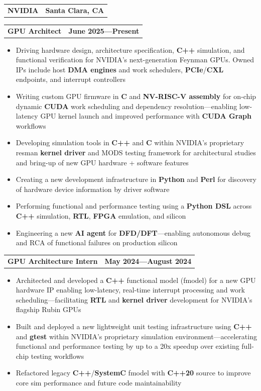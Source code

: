 \documentclass[letterpaper,10pt]{article}
\makeatletter
\newcommand{\resumeItem}[1]{
  \item \small{#1}\vspace{-2pt}
}
\newcommand{\resumeCompanyHeading}[2]{
  \vspace{-2pt}\item
    \begin{tabular*}{\textwidth}[t]{l@{\extracolsep{\fill}}r}
      {\fontsize{12}{12}\selectfont\textbf{#1}} & \small #2 \\
    \end{tabular*}\par\nobreak\vspace{-\parskip}\vspace{-4pt}
}
\newcommand{\resumeRoleHeading}[2]{
    \par\nobreak\vspace{4pt}\noindent
    \begin{tabular*}{\textwidth}[t]{l@{\extracolsep{\fill}}r}
      \hspace{0.2cm}\textbf{\normalsize #1} & \small #2 \\
    \end{tabular*}\vspace{-7pt}
}
\newcommand{\resumeExperienceItemListStart}{\begin{itemize}}
\newcommand{\resumeItemListEnd}{\end{itemize}\vspace{-5pt}}
\makeatother
\begin{document}
    \resumeCompanyHeading
      {NVIDIA}{\textbf{Santa Clara, CA}}
    \resumeRoleHeading
      {GPU Architect}{\textbf{June 2025---Present}}
    \resumeExperienceItemListStart
        \resumeItem{Driving hardware design, architecture specification, \textbf{C++} simulation, and functional verification for NVIDIA's next-generation Feynman GPUs. Owned IPs include host \textbf{DMA engines} and work schedulers, \textbf{PCIe}/\textbf{CXL} endpoints, and interrupt controllers}
        \resumeItem{Writing custom GPU firmware in \textbf{C} and \textbf{NV-RISC-V assembly} for on-chip dynamic \textbf{CUDA} work scheduling and dependency resolution---enabling low-latency GPU kernel launch and improved performance with \textbf{CUDA Graph} workflows}
        \resumeItem{Developing simulation tools in \textbf{C++} and \textbf{C} within NVIDIA's proprietary resman \textbf{kernel driver} and MODS testing framework for architectural studies and bring-up of new GPU hardware + software features}
        \resumeItem{Creating a new development infrastructure in \textbf{Python} and \textbf{Perl} for discovery of hardware device information by driver software}
        \resumeItem{Performing functional and performance testing using a \textbf{Python DSL} across \textbf{C++} simulation, \textbf{RTL}, \textbf{FPGA} emulation, and silicon}
        \resumeItem{Engineering a new \textbf{AI agent} for \textbf{DFD/DFT}---enabling autonomous debug and RCA of functional failures on production silicon}
    \resumeItemListEnd
    \vspace{-1pt}
    \resumeRoleHeading
      {GPU Architecture Intern}{\textbf{May 2024---August 2024}}
      \resumeExperienceItemListStart
            \resumeItem{Architected and developed a \textbf{C++} functional model (fmodel) for a new GPU hardware IP enabling low-latency, real-time interrupt processing and work scheduling---facilitating \textbf{RTL} and \textbf{kernel driver} development for NVIDIA’s flagship Rubin GPUs}
            \resumeItem{Built and deployed a new lightweight unit testing infrastructure using \textbf{C++} and \textbf{gtest} within NVIDIA's proprietary simulation environment---accelerating functional and performance testing by up to a 20x speedup over existing full-chip testing workflows}
            \resumeItem{Refactored legacy \textbf{C++}/\textbf{SystemC} fmodel with \textbf{C++20} source to improve core sim performance and future code maintainability}
      \resumeItemListEnd
    \vspace{6pt}
\end{document}
